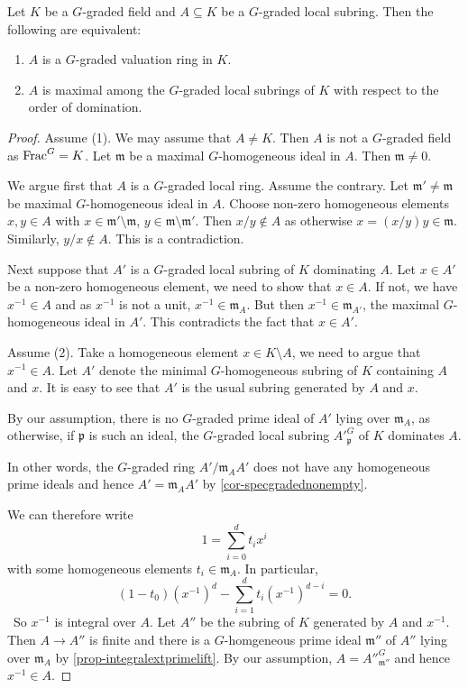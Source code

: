 \begin{proposition}\label{prop-valuationringchar}
    Let $K$ be a $G$-graded field and $A\subseteq K$ be a $G$-graded local subring. Then the following are equivalent:
    \begin{enumerate}
        \item $A$ is a $G$-graded valuation ring in $K$.
        \item $A$ is maximal among the $G$-graded local subrings of $K$ with respect to the order of domination.
    \end{enumerate}
\end{proposition}
\begin{proof}
    Assume (1). We may assume that $A\neq K$. Then $A$ is not a $G$-graded field as $\operatorname{Frac}^G=K$. Let $\mathfrak{m}$ be a maximal $G$-homogeneous ideal in $A$. Then $\mathfrak{m}\neq 0$. 
    
    We argue first that $A$ is a $G$-graded local ring. Assume the contrary.
    Let $\mathfrak{m}'\neq \mathfrak{m}$ be maximal $G$-homogeneous ideal in $A$. Choose non-zero homogeneous elements $x,y\in A$ with $x\in \mathfrak{m}'\setminus \mathfrak{m}$, $y\in \mathfrak{m}\setminus \mathfrak{m}'$. Then $x/y\not\in A$ as otherwise $x=(x/y)y\in \mathfrak{m}$. Similarly, $y/x\not\in A$. This is a contradiction.

    Next suppose that $A'$ is a $G$-graded local subring of $K$ dominating $A$. Let $x\in A'$ be a non-zero homogeneous element, we need to show that $x\in A$. If not, we have $x^{-1}\in A$ and as $x^{-1}$ is not a unit, $x^{-1}\in \mathfrak{m}_A$. But then $x^{-1}\in \mathfrak{m}_{A'}$, the maximal $G$-homogeneous ideal in $A'$. This contradicts the fact that $x\in A'$.

    Assume (2).  Take a homogeneous element $x\in K\setminus A$, we need to argue that $x^{-1}\in A$. Let $A'$ denote the minimal $G$-homogeneous subring of $K$ containing $A$ and $x$. It is easy to see that $A'$ is the usual subring generated by $A$ and $x$.
    
    By our assumption, there is no $G$-graded prime ideal of $A'$ lying over $\mathfrak{m}_A$, as otherwise, if $\mathfrak{p}$ is such an ideal, the $G$-graded local subring $A'^G_{\mathfrak{p}}$ of $K$ dominates $A$.

    In other words, the $G$-graded ring $A'/\mathfrak{m}_AA'$ does not  have any homogeneous prime ideals and hence $A'=\mathfrak{m}_AA'$ by \cref{cor-specgradednonempty}.

    We can therefore write
    \[
      1=\sum_{i=0}^d t_ix^i  
    \]
    with some homogeneous elements $t_i\in \mathfrak{m}_A$. In particular,
    \[
        (1-t_0)(x^{-1})^d-\sum_{i=1}^d t_i (x^{-1})^{d-i}=0.  
    \]\
    So $x^{-1}$ is integral over $A$. Let $A''$ be the subring of $K$ generated by $A$ and $x^{-1}$. Then $A\rightarrow A''$ is finite and there is a $G$-homgeneous prime ideal $\mathfrak{m}''$ of $A''$ lying over $\mathfrak{m}_A$ by \cref{prop-integralextprimelift}. By our assumption, $A=A''^G_{\mathfrak{m}''}$ and hence $x^{-1}\in A$.


\end{proof}
